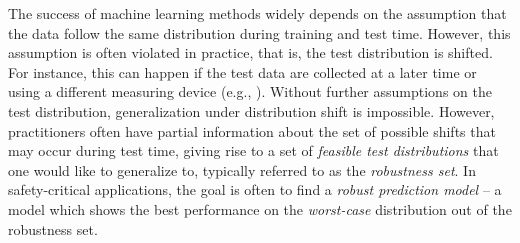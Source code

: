 
The success of machine learning methods widely depends on the assumption that the data follow the same distribution during training and test time. However, this assumption is often violated in practice, that is, the test distribution is shifted. For instance, this can happen if the test data are collected at a later time or using a different measuring device (e.g., \cite{koh2021wilds}).
Without further assumptions on the test distribution, 
generalization under distribution shift is impossible.
However, practitioners often have partial information about the 
set of possible shifts that may occur during test time, giving rise to a set of \emph{feasible test distributions} that one would like to generalize to, typically referred to as the \emph{robustness set}.
In safety-critical applications,
the goal is often
to find a \emph{robust prediction model} – a model which shows the best performance on the \emph{worst-case} distribution out of the robustness set. 
\par

